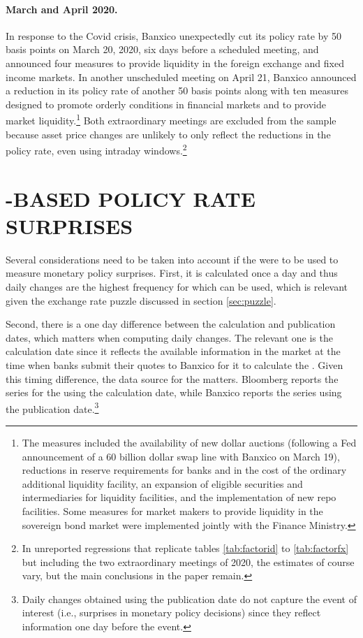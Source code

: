 \paragraph{March and April 2020.} In response to the Covid crisis, Banxico unexpectedly cut its policy rate by 50 basis points on March 20, 2020, six days before a scheduled meeting, and announced four measures to provide liquidity in the foreign exchange and fixed income markets. In another unscheduled meeting on April 21, Banxico announced a reduction in its policy rate of another 50 basis points along with ten measures designed to promote orderly conditions in financial markets and to provide market liquidity.\footnote{The measures included the availability of new dollar auctions (following a Fed announcement of a 60 billion dollar swap line with Banxico on March 19), reductions in reserve requirements for banks and in the cost of the ordinary additional liquidity facility, an expansion of eligible securities and intermediaries for liquidity facilities, and the implementation of new repo facilities. Some measures for market makers to provide liquidity in the sovereign bond market were implemented jointly with the Finance Ministry.} Both extraordinary meetings are excluded from the sample because asset price changes are unlikely to only reflect the reductions in the policy rate, even using intraday windows.\footnote{In unreported regressions that replicate tables \ref{tab:factorid} to \ref{tab:factorfx} but including the two extraordinary meetings of 2020, the estimates of course vary, but the main conclusions in the paper remain.} 

\sectitlespace
\section{\tiie{}-BASED POLICY RATE SURPRISES} \label{sec:tiie}
\sectitlespace

Several considerations need to be taken into account if the \tiie{} were to be used to measure monetary policy surprises. First, it is calculated once a day and thus daily changes are the highest frequency for which \tiie{} can be used, which is relevant given the exchange rate puzzle discussed in section \ref{sec:puzzle}. 

Second, there is a one day difference between the calculation and publication dates, which matters when computing daily changes. The relevant one is the calculation date since it reflects the available information in the market at the time when banks submit their quotes to Banxico for it to calculate the \tiie. Given this timing difference, the data source for the \tiie{} matters. Bloomberg reports the series for the \tiie{} using the calculation date, while Banxico reports the series using the publication date.\footnote{ Daily changes obtained using the publication date do not capture the event of interest (i.e., surprises in monetary policy decisions) since they reflect information one day before the event.}

